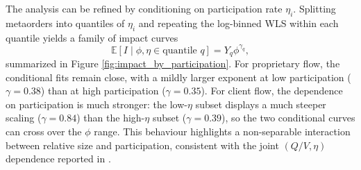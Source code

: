 \documentclass[11pt]{article}
\newcommand{\E}{\mathbb{E}}
\begin{document}
The analysis can be refined by conditioning on participation rate
$\eta_i$. Splitting metaorders into quantiles of $\eta_i$ and repeating
the log-binned WLS within each quantile yields a family of impact curves
\[
  \E[I \mid \phi, \eta \in \text{quantile }q] = Y_q \phi^{\gamma_q},
\]
summarized in Figure \ref{fig:impact_by_participation}. 
For proprietary flow, the conditional fits remain close, with a mildly larger exponent at low participation 
($\gamma = 0.38$) than at high participation ($\gamma = 0.35$). For client flow, the dependence on 
participation is much stronger: the low-$\eta$ subset displays a much steeper scaling ($\gamma = 0.84$) than 
the high-$\eta$ subset ($\gamma = 0.39$), so the two conditional curves can cross over the $\phi$ range. This 
behaviour highlights a non-separable interaction between relative size and participation, consistent with the 
joint $(Q/V,\eta)$ dependence reported in \cite{zarinelli}.%



\end{document}
